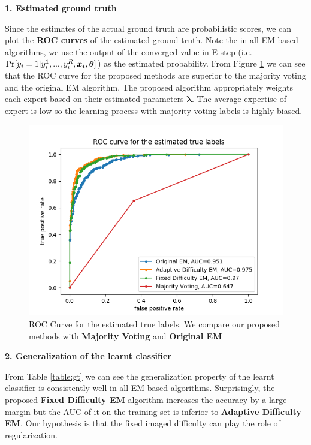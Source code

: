 \textbf{1. Estimated ground truth}

Since the estimates of the actual ground truth are probabilistic scores, we can plot the \textbf{ROC curves} of the estimated ground truth. Note the in all EM-based algorithms, we use the output of the converged value in E step (i.e. $\textup{Pr}[y_i=1|y_i^1,...,y_i^R,\bm{x_i},\bm{\theta} ]$) as the estimated probability. From Figure \ref{fig:gr} we can see that the ROC curve for the proposed methods are superior to the majority voting and the original EM algorithm. The proposed algorithm appropriately weights each expert based on their estimated parameters $\bm{\lambda}$. The average expertise of expert is low so the learning process with majority voting labels is highly biased. 

\begin{figure}[htbp]
    \centering
    \includegraphics[width=5.0in]{image/roc_plot.png}
    \caption{ROC Curve for the estimated true labels. We compare our proposed methods with \textbf{Majority Voting} and \textbf{Original EM}} 
    \label{fig:gr}
\end{figure}

\textbf{2. Generalization of the learnt classifier}

From Table \ref{table:gt} we can see the generalization property of the learnt classifier is consistently well in all EM-based algorithms. Surprisingly, the proposed \textbf{Fixed Difficulty EM} algorithm increases the accuracy by a large margin but the AUC of it on the training set is inferior to \textbf{Adaptive Difficulty EM}. Our hypothesis is that the fixed imaged difficulty can play the role of regularization.

